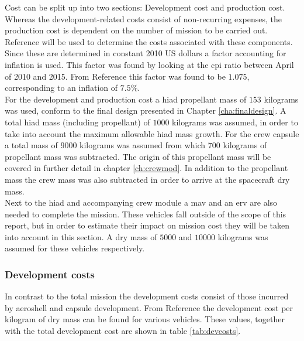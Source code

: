 Cost can be split up into two sections: Development cost and production cost. Whereas the development-related costs consist of non-recurring expenses, the production cost is dependent on the number of mission to be carried out. Reference \cite{Wertz2011} will be used to determine the costs associated with these components. Since these are determined in constant 2010 US dollars a factor accounting for inflation is used. This factor was found by looking at the \gls{cpi} ratio between April of 2010 and 2015. From Reference \cite{Crawford2015} this factor was found to be $1.075$, corresponding to an inflation of $7.5\%$.\\
For the development and production cost a \gls{hiad} propellant mass of $153$ kilograms was used, conform to the final design presented in Chapter \ref{cha:finaldesign}. A total \gls{hiad} mass (including propellant) of $1000$ kilograms was assumed, in order to take into account the maximum allowable \gls{hiad} mass growth. For the crew capsule a total mass of $9000$ kilograms was assumed from which $700$ kilograms of propellant mass was subtracted. The origin of this propellant mass will be covered in further detail in chapter \ref{ch:crewmod}. In addition to the propellant mass the crew mass was also subtracted in order to arrive at the spacecraft dry mass.\\
Next to the \gls{hiad} and accompanying crew module a \acrlong{mav} and an \acrlong{erv} are also needed to complete the mission. These vehicles fall outside of the scope of this report, but in order to estimate their impact on mission cost they will be taken into account in this section. A dry mass of $5000$ and $10000$ kilograms was assumed for these vehicles respectively.

\subsubsection{Development costs}
In contrast to the total mission the development costs consist of those incurred by aeroshell and capsule development. From Reference \cite{Wertz2011} the development cost per kilogram of dry mass can be found for various vehicles. These values, together with the total development cost are shown in table \ref{tab:devcosts}.

